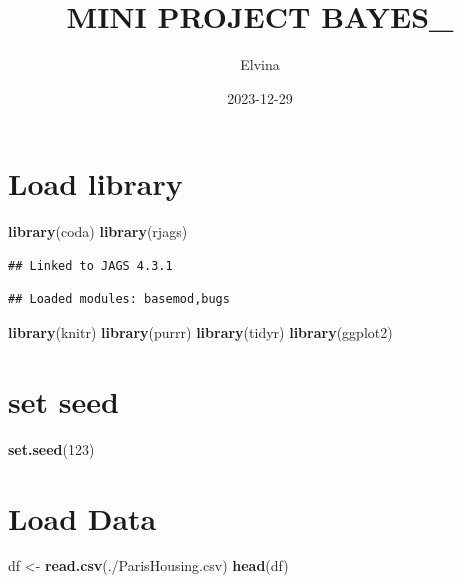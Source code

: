 \documentclass[
]{article}
\title{MINI PROJECT BAYES\_}
\author{Elvina}
\date{2023-12-29}
\newenvironment{Shaded}{\begin{snugshade}}{\end{snugshade}}
\newcommand{\DecValTok}[1]{\textcolor[rgb]{0.00,0.00,0.81}{#1}}
\newcommand{\FunctionTok}[1]{\textcolor[rgb]{0.13,0.29,0.53}{\textbf{#1}}}
\newcommand{\NormalTok}[1]{#1}
\newcommand{\OtherTok}[1]{\textcolor[rgb]{0.56,0.35,0.01}{#1}}
\newcommand{\StringTok}[1]{\textcolor[rgb]{0.31,0.60,0.02}{#1}}
\begin{document}
\maketitle

\section{Load library}\label{load-library}

\begin{Shaded}
\begin{Highlighting}[]
\FunctionTok{library}\NormalTok{(coda)}
\FunctionTok{library}\NormalTok{(rjags)}
\end{Highlighting}
\end{Shaded}

\begin{verbatim}
## Linked to JAGS 4.3.1
\end{verbatim}

\begin{verbatim}
## Loaded modules: basemod,bugs
\end{verbatim}

\begin{Shaded}
\begin{Highlighting}[]
\FunctionTok{library}\NormalTok{(knitr)}
\FunctionTok{library}\NormalTok{(purrr)}
\FunctionTok{library}\NormalTok{(tidyr)}
\FunctionTok{library}\NormalTok{(ggplot2)}
\end{Highlighting}
\end{Shaded}

\section{set seed}\label{set-seed}

\begin{Shaded}
\begin{Highlighting}[]
\FunctionTok{set.seed}\NormalTok{(}\DecValTok{123}\NormalTok{)}
\end{Highlighting}
\end{Shaded}

\section{Load Data}\label{load-data}

\begin{Shaded}
\begin{Highlighting}[]
\NormalTok{df }\OtherTok{\textless{}{-}} \FunctionTok{read.csv}\NormalTok{(}\StringTok{\textquotesingle{}./ParisHousing.csv\textquotesingle{}}\NormalTok{)}
\FunctionTok{head}\NormalTok{(df)}
\end{Highlighting}
\end{Shaded}
\end{document}
